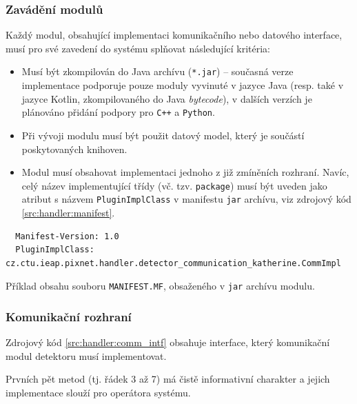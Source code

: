 \subsubsection{Zavádění modulů}\label{chap:handler:detector_layer:module_init}
Každý modul, obsahující implementaci komunikačního nebo datového interface, musí pro své zavedení do systému splňovat následující kritéria:

\begin{itemize}
	\item Musí být zkompilován do Java archívu (\texttt{*.jar}) -- současná verze implementace podporuje pouze moduly vyvinuté v jazyce Java (resp. také v jazyce Kotlin, zkompilovaného do Java \textit{bytecode}), v dalších verzích je plánováno přidání podpory pro \texttt{C++} a \texttt{Python}.
	\item Při vývoji modulu musí být použit datový model, který je součástí poskytovaných knihoven.
	\item Modul musí obsahovat implementaci jednoho z již zmíněních rozhraní. Navíc, celý název implementující třídy (vč. tzv. \texttt{package}) musí být uveden jako atribut s názvem \texttt{PluginImplClass} v manifestu \texttt{jar} archívu, viz zdrojový kód \ref{src:handler:manifest}.
\end{itemize}

\begin{code}[h!]
\begin{verbatim}
  Manifest-Version: 1.0
  PluginImplClass: cz.ctu.ieap.pixnet.handler.detector_communication_katherine.CommImpl  
\end{verbatim}
\caption{Příklad obsahu souboru \texttt{MANIFEST.MF}, obsaženého v \texttt{jar} archívu modulu.}
\label{src:handler:manifest}
\end{code}

\subsubsection{Komunikační rozhraní}\label{chap:handler:detector_layer:commIntf}
Zdrojový kód \ref{src:handler:comm_intf} obsahuje interface, který komunikační modul detektoru musí implementovat.

Prvních pět metod (tj. řádek 3 až 7) má čistě informativní charakter a jejich implementace slouží pro operátora systému.

